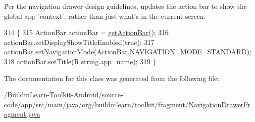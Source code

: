 Per the navigation drawer design guidelines, updates the action bar to show the global app 'context', rather than just what's in the current screen. 
\begin{DoxyCode}
314                                                 \{
315         ActionBar actionBar = \hyperlink{classorg_1_1buildmlearn_1_1toolkit_1_1fragment_1_1NavigationDrawerFragment_a84ffac4d244a528b278d27732387b551}{getActionBar}();
316         actionBar.setDisplayShowTitleEnabled(\textcolor{keyword}{true});
317         actionBar.setNavigationMode(ActionBar.NAVIGATION\_MODE\_STANDARD);
318         actionBar.setTitle(R.string.app\_name);
319     \}
\end{DoxyCode}


The documentation for this class was generated from the following file\-:\begin{DoxyCompactItemize}
\item 
/\-Buildm\-Learn-\/\-Toolkit-\/\-Android/source-\/code/app/src/main/java/org/buildmlearn/toolkit/fragment/\hyperlink{NavigationDrawerFragment_8java}{Navigation\-Drawer\-Fragment.\-java}\end{DoxyCompactItemize}
